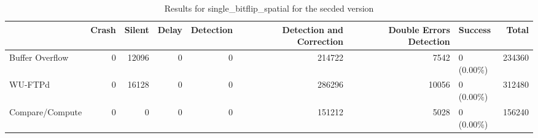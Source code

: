 \begin{table}[t]
	\centering
	\caption{Results for single_bitflip_spatial for the secded version}
	\label{table:end_sim_by_status_secded_5_single_bitflip_spatial}
	\begin{tabular}{lrrrrrrlr}
		\toprule
		                & Crash & Silent & Delay & Detection & Detection and Correction & Double Errors Detection & Success    & Total  \\
		\midrule
		Buffer Overflow & 0     & 12096  & 0     & 0         & 214722                   & 7542                    & 0 (0.00\%) & 234360 \\
		WU-FTPd         & 0     & 16128  & 0     & 0         & 286296                   & 10056                   & 0 (0.00\%) & 312480 \\
		Compare/Compute & 0     & 0      & 0     & 0         & 151212                   & 5028                    & 0 (0.00\%) & 156240 \\
		\bottomrule
	\end{tabular}
\end{table}
